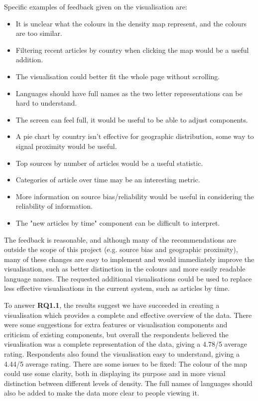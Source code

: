 \documentclass{l4proj}
\begin{document}
Specific examples of feedback given on the visualisation are:
\begin{itemize}
    \item It is unclear what the colours in the density map represent, and the colours are too similar.
    \item Filtering recent articles by country when clicking the map would be a useful addition.
    \item The visualisation could better fit the whole page without scrolling.
    \item Languages should have full names as the two letter representations can be hard to understand.
    \item The screen can feel full, it would be useful to be able to adjust components.
    \item A pie chart by country isn't effective for geographic distribution, some way to signal proximity would be useful.
    \item Top sources by number of articles would be a useful statistic.
    \item Categories of article over time may be an interesting metric.
    \item More information on source bias/reliability would be useful in considering the reliability of information.
    \item The "new articles by time" component can be difficult to interpret.
\end{itemize}

The feedback is reasonable, and although many of the recommendations are outside the scope of this project (e.g. source bias and geographic proximity), many of these changes are easy to implement and would immediately improve the visualisation, such as better distinction in the colours and more easily readable language names. The requested additional visualisations could be used to replace less effective visualisations in the current system, such as articles by time. \par
To answer \textbf{RQ1.1}, the results suggest we have succeeded in creating a visualisation which provides a complete and effective overview of the data. There were some suggestions for extra features or visualisation components and criticism of existing components, but overall the respondents believed the visualisation was a complete representation of the data, giving a 4.78/5 average rating. Respondents also found the visualisation easy to understand, giving a 4.44/5 average rating. There are some issues to be fixed: The colour of the map could use some clarity, both in displaying its purpose and in more visual distinction between different levels of density. The full names of languages should also be added to make the data more clear to people viewing it.
\end{document}
